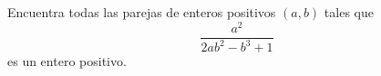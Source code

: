 Encuentra todas las parejas de enteros positivos $(a,b)$ tales que \[ \dfrac{a^2}{2ab^2-b^3+1} \] es un entero positivo.